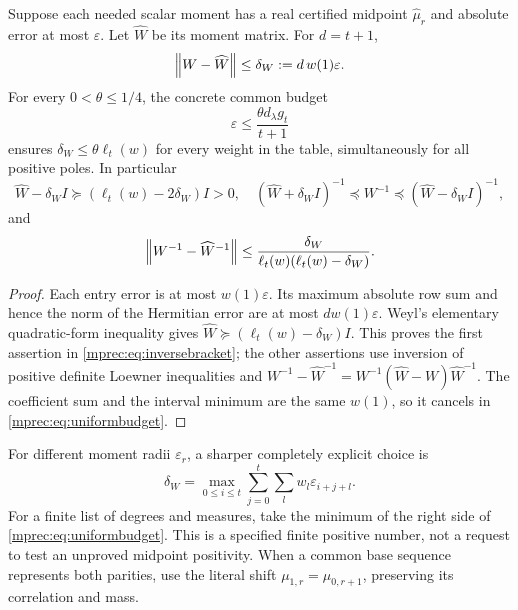 \begin{mprectheorem}\label{mprec:thm:budget}
Suppose each needed scalar moment has a real certified midpoint
$\widehat\mu_r$ and absolute error at most $\varepsilon$.
Let $\widehat W$ be its moment matrix. For $d=t+1$,
\begin{equation}\label{mprec:eq:deltaW}
 \left\lVert W-\widehat W\right\rVert\le\delta_W:=d\,w(1)\varepsilon.
\end{equation}
For every $0<\theta\le1/4$, the concrete common budget
\begin{equation}\label{mprec:eq:uniformbudget}
 \boxed{\varepsilon\le\frac{\theta d_\lambda g_t}{t+1}}
\end{equation}
ensures $\delta_W\le\theta\ell_t(w)$ for every weight in
the table, simultaneously for all positive poles. In particular
\begin{equation}\label{mprec:eq:inversebracket}
 \widehat W-\delta_W I\succeq(\ell_t(w)-2\delta_W)I>0,
 \quad
 (\widehat W+\delta_W I)^{-1}\preceq W^{-1}
 \preceq(\widehat W-\delta_W I)^{-1},
\end{equation}
and
\begin{equation}\label{mprec:eq:inverseerror}
 \left\lVert W^{-1}-\widehat W^{-1}\right\rVert
 \le\frac{\delta_W}{\ell_t(w)(\ell_t(w)-\delta_W)}.
\end{equation}
\end{mprectheorem}
\begin{proof}
Each entry error is at most $w(1)\varepsilon$. Its maximum
absolute row sum and hence the norm of the Hermitian error are
at most $d w(1)\varepsilon$. Weyl's elementary quadratic-form
inequality gives $\widehat W\succeq(\ell_t(w)-\delta_W)I$.
This proves the first assertion in \eqref{mprec:eq:inversebracket};
the other assertions use inversion of positive definite Loewner
inequalities and
$W^{-1}-\widehat W^{-1}=W^{-1}(\widehat W-W)\widehat W^{-1}$.
The coefficient sum and the interval minimum are the same $w(1)$,
so it cancels in \eqref{mprec:eq:uniformbudget}.
\end{proof}

For different moment radii $\varepsilon_r$, a sharper completely
explicit choice is
\[
 \delta_W=\max_{0\le i\le t}\sum_{j=0}^t
                \sum_lw_l\varepsilon_{i+j+l}.
\]
For a finite list of degrees and measures, take the minimum of the
right side of \eqref{mprec:eq:uniformbudget}. This is a specified finite
positive number, not a request to test an unproved midpoint
positivity. When a common base sequence represents both parities,
use the literal shift $\mu_{1,r}=\mu_{0,r+1}$, preserving its
correlation and mass.

